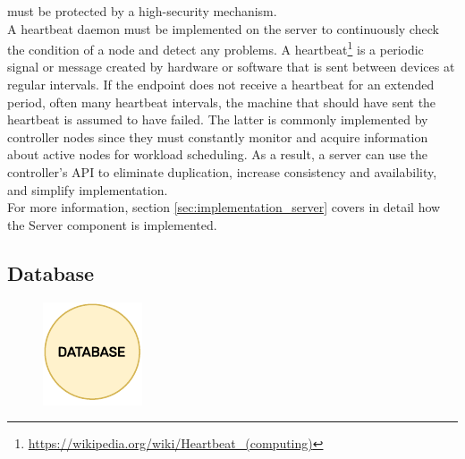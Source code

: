 must be protected by a high-security mechanism. \\ %
A heartbeat daemon must be implemented on the server to continuously check the
condition of a node and detect any problems. A heartbeat\footnote{\url{https://wikipedia.org/wiki/Heartbeat_(computing)}}
is a periodic signal or message created by hardware or software that is sent between
devices at regular intervals. If the endpoint does not receive a heartbeat for
an extended period, often many heartbeat intervals, the machine that should have
sent the heartbeat is assumed to have failed. The latter is commonly implemented
by controller nodes since they must constantly monitor and acquire information about
active nodes for workload scheduling. As a result, a server can use the controller's
API to eliminate duplication, increase consistency and availability, and simplify
implementation. \\ %
For more information, section \ref{sec:implementation_server} covers in detail
how the Server component is implemented.

\subsection{Database}
\label{subsec:architecture_components_database}

\begin{figure}
  \centering
  \includegraphics[width=\linewidth]{images/architecture/database.pdf}
\end{figure}

